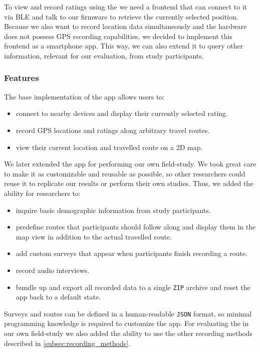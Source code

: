 To view and record ratings using the \likertshift we need a frontend that can connect to it via BLE and talk to our firmware to retrieve the currently selected position.
Because we also want to record location data simultaneously and the \likertshift hardware does not possess GPS recording capabilities, we decided to implement this frontend as a smartphone app.
This way, we can also extend it to query other information, relevant for our evaluation, from study participants.

\subsubsection{Features}

The base implementation of the app allows users to:

\begin{itemize}[itemsep=0em]
    \item connect to nearby \likertshift devices and display their currently selected rating.
    \item record GPS locations and \likertshift ratings along arbitrary travel routes.
    \item view their current location and travelled route on a 2D map.
\end{itemize}

\noindent
We later extended the app for performing our own field-study.
We took great care to make it as customizable and reusable as possible, so other researchers could reuse it to replicate our results or perform their own studies.
Thus, we added the ability for researchers to:

\begin{itemize}[itemsep=0em]
    \item inquire basic demographic information from study participants.
    \item predefine routes that participants should follow along and display them in the map view in addition to the actual travelled route.
    \item add custom surveys that appear when participants finish recording a route.
    \item record audio interviews.
    \item bundle up and export all recorded data to a single \texttt{ZIP} archive and reset the app back to a default state.
\end{itemize}

\noindent
Surveys and routes can be defined in a human-readable \texttt{JSON} format, so minimal programming knowledge is required to customize the app.
For evaluating the \likertshift in our own field-study we also added the ability to use the other recording methods described in \autoref{subsec:recording_methods}.


